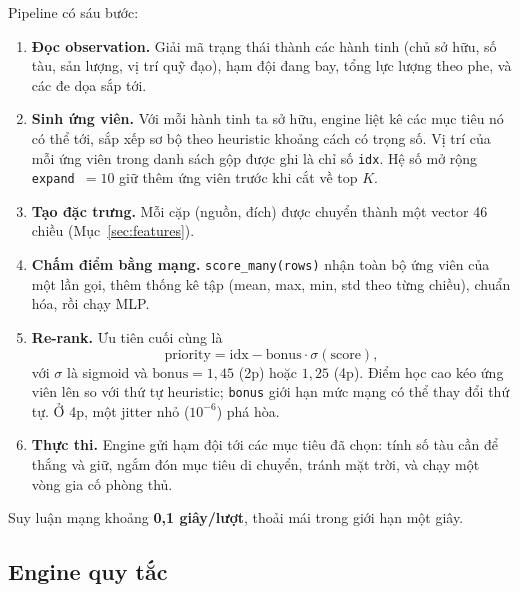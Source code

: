 \documentclass[conference]{IEEEtran}
\begin{document}
Pipeline có sáu bước:
\begin{enumerate}
\item \textbf{Đọc observation.} Giải mã trạng thái thành các hành tinh (chủ sở hữu, số tàu, sản lượng, vị trí quỹ đạo), hạm đội đang bay, tổng lực lượng theo phe, và các đe dọa sắp tới.
\item \textbf{Sinh ứng viên.} Với mỗi hành tinh ta sở hữu, engine liệt kê các mục tiêu nó có thể tới, sắp xếp sơ bộ theo heuristic khoảng cách có trọng số. Vị trí của mỗi ứng viên trong danh sách gộp được ghi là chỉ số \texttt{idx}. Hệ số mở rộng \texttt{expand}~$=10$ giữ thêm ứng viên trước khi cắt về top $K$.
\item \textbf{Tạo đặc trưng.} Mỗi cặp (nguồn, đích) được chuyển thành một vector 46 chiều (Mục~\ref{sec:features}).
\item \textbf{Chấm điểm bằng mạng.} \texttt{score\_many(rows)} nhận toàn bộ ứng viên của một lần gọi, thêm thống kê tập (mean, max, min, std theo từng chiều), chuẩn hóa, rồi chạy MLP.
\item \textbf{Re-rank.} Ưu tiên cuối cùng là
\begin{equation}
\label{eq:priority}
\mathrm{priority} = \mathrm{idx} - \mathrm{bonus} \cdot \sigma(\mathrm{score}),
\end{equation}
với $\sigma$ là sigmoid và $\mathrm{bonus} = 1{,}45$ (2p) hoặc $1{,}25$ (4p). Điểm học cao kéo ứng viên lên so với thứ tự heuristic; \texttt{bonus} giới hạn mức mạng có thể thay đổi thứ tự. Ở 4p, một jitter nhỏ ($10^{-6}$) phá hòa.
\item \textbf{Thực thi.} Engine gửi hạm đội tới các mục tiêu đã chọn: tính số tàu cần để thắng và giữ, ngắm đón mục tiêu di chuyển, tránh mặt trời, và chạy một vòng gia cố phòng thủ.
\end{enumerate}
Suy luận mạng khoảng \textbf{0{,}1 giây/lượt}, thoải mái trong giới hạn một giây.

\subsection{Engine quy tắc}
\end{document}
